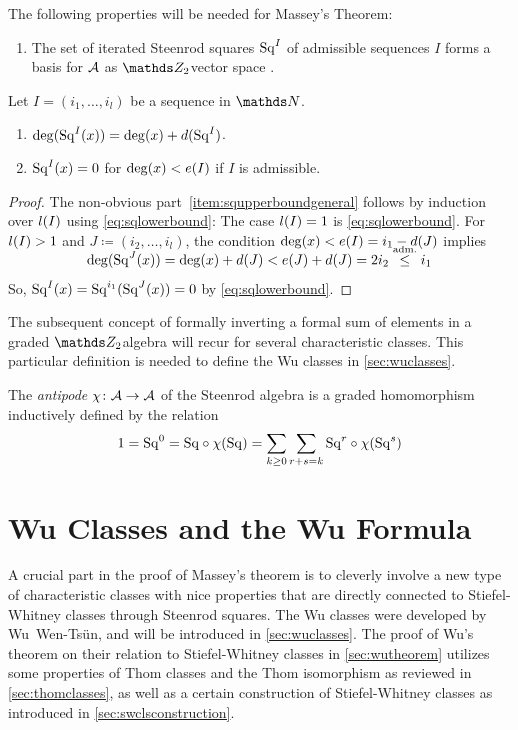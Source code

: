\begin{Rem}\label{rem:sq}
  The following properties will be needed for Massey's Theorem:
  \begin{enumerate}
  \item The set of iterated Steenrod squares $\mathrm{Sq}^{I}$ of admissible
    sequences $I$ forms a basis for $\mathcal{A}$ as $\Zmod2$\nbd{}vector space
    \cite[Chap.~6, Theorem~1]{mosher}.
  \end{enumerate}
  Let $I=(i_1,\dotsc,i_l)$ be a sequence in $\Nat$.
  \begin{enumerate}[resume]
  \item $\deg(\mathrm{Sq}^{I}(x)) = \deg(x) + d(\mathrm{Sq}^{I})$.
  \item\label{item:squpperboundgeneral}
    $\mathrm{Sq}^{I}(x) = 0$ for $\deg(x)<e(I)$ if $I$ is admissible.
  \end{enumerate}
  \begin{proof}
    The non-obvious part~\ref{item:squpperboundgeneral} follows by
    induction over $l(I)$ using \eqref{eq:sqlowerbound}:
    The case $l(I)=1$ is \eqref{eq:sqlowerbound}.
    For $l(I)>1$ and $J\coloneqq(i_2,\dotsc,i_l)$, the condition
    $\deg(x) < e(I)=i_1-d(J)$
    implies
    \begin{gather*}
      \SwapAboveDisplaySkip
      \deg(\Sq J(x))
      = \deg(x)+\d(J) < \e(J)+\d(J) = 2i_2
      \overset{\text{adm.}}\leq i_1
    \end{gather*}
    So,
    $\mathrm{Sq}^{I}(x)=\mathrm{Sq}^{i_1}(\mathrm{Sq}^{J}(x))=0$ by \eqref{eq:sqlowerbound}.
  \end{proof}

\end{Rem}

The subsequent concept of formally inverting a formal sum of elements
in a graded $\Zmod2$\nbd{}algebra will recur for several characteristic
classes. This particular definition is needed to define the Wu classes
in \autoref{sec:wuclasses}. 
\begin{Def}\label{def:antipode}
  The \emph{antipode} $\chi\colon \mathcal{A}\to\mathcal{A}$ of the Steenrod algebra is a
  graded homomorphism inductively defined by the relation
  \begin{gather*}
    1 = \mathrm{Sq}^{0}
    = \mathrm{Sq} \circ \chi(\mathrm{Sq})
    = \sum_{k\geq0}\sum_{r+s=k} \mathrm{Sq}^{r} \circ \chi(\mathrm{Sq}^{s})
  \end{gather*}
\end{Def}

\section{Wu Classes and the Wu Formula}\label{sec:wuclassesmain}
A crucial part in the proof of Massey's theorem is to cleverly involve
a new type of characteristic classes with nice properties that are
directly connected to Stiefel-Whitney classes through Steenrod
squares.
The Wu classes were developed by Wu~Wen-Tsün, and will be introduced in
\autoref{sec:wuclasses}.
The proof of Wu's theorem on their relation to Stiefel-Whitney
classes in \autoref{sec:wutheorem} utilizes some properties of Thom
classes and the Thom isomorphism as reviewed in
\autoref{sec:thomclasses}, as well as a certain construction of
Stiefel-Whitney classes as introduced in
\autoref{sec:swclsconstruction}.


